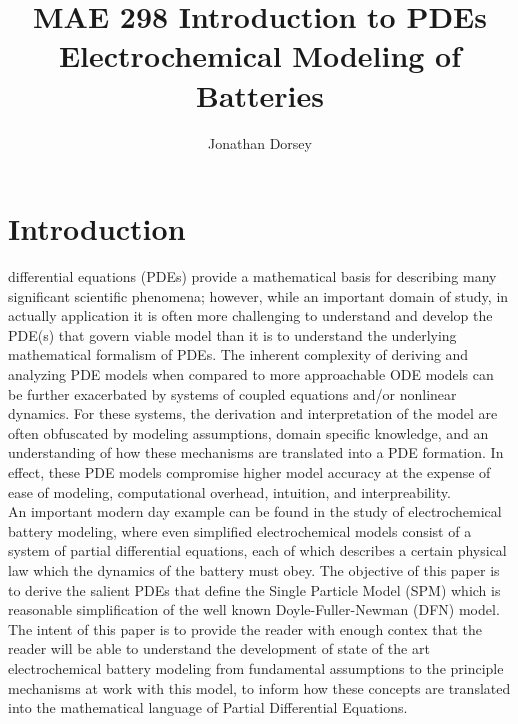 \documentclass[lettersize,journal]{IEEEtran}
\begin{document}
\title{MAE 298 Introduction to PDEs \\ Electrochemical Modeling of Batteries}

\author{Jonathan Dorsey}



\maketitle


\section{Introduction}
 differential equations (PDEs) provide a mathematical basis for describing many significant scientific phenomena; however, while an important domain of study, in actually application it is often more challenging to understand and develop the PDE(s) that govern viable model than it is to understand the underlying mathematical formalism of PDEs. The inherent complexity of deriving and analyzing PDE models when compared to more approachable ODE models can be further exacerbated by systems of coupled equations and/or nonlinear dynamics. For these systems, the derivation and interpretation of the model are often obfuscated by modeling assumptions, domain specific knowledge, and an understanding of how these mechanisms are translated into a PDE formation. In effect, these PDE models compromise higher model accuracy at the expense of ease of modeling, computational overhead, intuition, and interpreability. \\

An important modern day example can be found in the study of electrochemical battery modeling, where even simplified electrochemical models consist of a system of partial differential equations, each of which describes a certain physical law which the dynamics of the battery must obey. The objective of this paper is to derive the salient PDEs that define the Single Particle Model (SPM) which is reasonable simplification of the well known Doyle-Fuller-Newman (DFN) model. The intent of this paper is to provide the reader with enough contex that the reader will be able to understand the development of state of the art electrochemical battery modeling from fundamental assumptions to the principle mechanisms at work with this model, to inform how these concepts are translated into the mathematical language of Partial Differential Equations.
\end{document}

